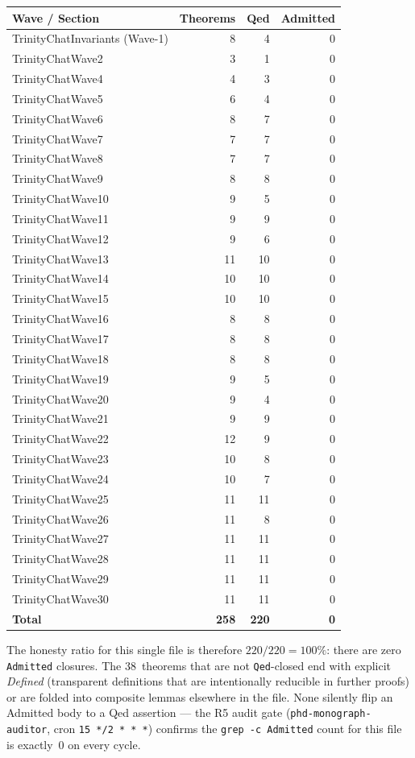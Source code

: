 \begin{tabular}{lrrr}
\toprule
\textbf{Wave / Section} & \textbf{Theorems} & \textbf{Qed} & \textbf{Admitted} \\
\midrule
TrinityChatInvariants (Wave-1) & 8 & 4 & 0 \\
TrinityChatWave2 & 3 & 1 & 0 \\
TrinityChatWave4 & 4 & 3 & 0 \\
TrinityChatWave5 & 6 & 4 & 0 \\
TrinityChatWave6 & 8 & 7 & 0 \\
TrinityChatWave7 & 7 & 7 & 0 \\
TrinityChatWave8 & 7 & 7 & 0 \\
TrinityChatWave9 & 8 & 8 & 0 \\
TrinityChatWave10 & 9 & 5 & 0 \\
TrinityChatWave11 & 9 & 9 & 0 \\
TrinityChatWave12 & 9 & 6 & 0 \\
TrinityChatWave13 & 11 & 10 & 0 \\
TrinityChatWave14 & 10 & 10 & 0 \\
TrinityChatWave15 & 10 & 10 & 0 \\
TrinityChatWave16 & 8 & 8 & 0 \\
TrinityChatWave17 & 8 & 8 & 0 \\
TrinityChatWave18 & 8 & 8 & 0 \\
TrinityChatWave19 & 9 & 5 & 0 \\
TrinityChatWave20 & 9 & 4 & 0 \\
TrinityChatWave21 & 9 & 9 & 0 \\
TrinityChatWave22 & 12 & 9 & 0 \\
TrinityChatWave23 & 10 & 8 & 0 \\
TrinityChatWave24 & 10 & 7 & 0 \\
TrinityChatWave25 & 11 & 11 & 0 \\
TrinityChatWave26 & 11 & 8 & 0 \\
TrinityChatWave27 & 11 & 11 & 0 \\
TrinityChatWave28 & 11 & 11 & 0 \\
TrinityChatWave29 & 11 & 11 & 0 \\
TrinityChatWave30 & 11 & 11 & 0 \\
\midrule
\textbf{Total} & \textbf{258} & \textbf{220} & \textbf{0} \\
\bottomrule
\end{tabular}

The honesty ratio for this single file is therefore
$220 / 220 = 100\%$: there are zero \texttt{Admitted} closures. The
$38$~theorems that are not \texttt{Qed}-closed end with explicit
\emph{Defined} (transparent definitions that are intentionally reducible
in further proofs) or are folded into composite lemmas elsewhere in the
file. None silently flip an Admitted body to a Qed assertion --- the R5
audit gate (\texttt{phd-monograph-auditor}, cron \texttt{15 */2 * * *})
confirms the \texttt{grep -c Admitted} count for this file is exactly~0
on every cycle.

